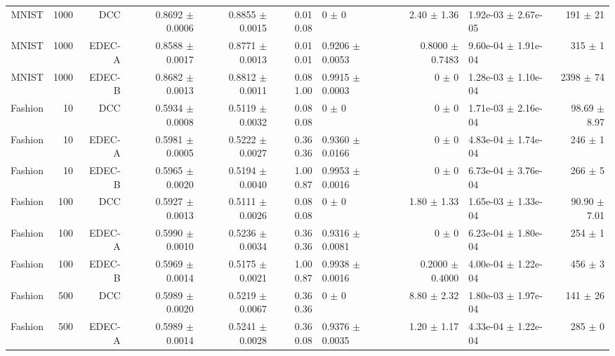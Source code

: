 \begin{table}[ht]
{\begin{tabular}{ | r | r | r | r | r | r | H  r | H  r |}
MNIST & 1000 & DCC & { \color{green} 0.8692 $\pm$ 0.0006} & { \color{green} 0.8855 $\pm$ 0.0015} & { \color{green} 0.01} { \color{green} 0.08} & 0 $\pm$ 0 & 2.40 $\pm$ 1.36 & 1.92e-03 $\pm$ 2.67e-05 & 191 $\pm$ 21 \\ 
MNIST & 1000 & EDEC-A & 0.8588 $\pm$ 0.0017 & 0.8771 $\pm$ 0.0013 & { \color{black}0.01} { \color{black}0.01} & 0.9206 $\pm$ 0.0053 & 0.8000 $\pm$ 0.7483 & 9.60e-04 $\pm$ 1.91e-04 & 315 $\pm$ 1 \\ 
MNIST & 1000 & EDEC-B & { \color{blue} 0.8682 $\pm$ 0.0013} & 0.8812 $\pm$ 0.0011 & { \color{green} 0.08} { \color{black}1.00} & 0.9915 $\pm$ 0.0003 & 0 $\pm$ 0 & 1.28e-03 $\pm$ 1.10e-04 & 2398 $\pm$ 74 \\ \hline 
Fashion & 10 & DCC & 0.5934 $\pm$ 0.0008 & 0.5119 $\pm$ 0.0032 & { \color{black}0.08} { \color{black}0.08} & 0 $\pm$ 0 & 0 $\pm$ 0 & 1.71e-03 $\pm$ 2.16e-04 & 98.69 $\pm$ 8.97 \\ 
Fashion & 10 & EDEC-A & { \color{green} 0.5981 $\pm$ 0.0005} & { \color{green} 0.5222 $\pm$ 0.0027} & { \color{green} 0.36} { \color{green} 0.36} & 0.9360 $\pm$ 0.0166 & 0 $\pm$ 0 & 4.83e-04 $\pm$ 1.74e-04 & 246 $\pm$ 1 \\ 
Fashion & 10 & EDEC-B & { \color{blue} 0.5965 $\pm$ 0.0020} & { \color{blue} 0.5194 $\pm$ 0.0040} & { \color{black}1.00} { \color{green} 0.87} & 0.9953 $\pm$ 0.0016 & 0 $\pm$ 0 & 6.73e-04 $\pm$ 3.76e-04 & 266 $\pm$ 5 \\ \hline 
Fashion & 100 & DCC & 0.5927 $\pm$ 0.0013 & 0.5111 $\pm$ 0.0026 & { \color{black}0.08} { \color{black}0.08} & 0 $\pm$ 0 & 1.80 $\pm$ 1.33 & 1.65e-03 $\pm$ 1.33e-04 & 90.90 $\pm$ 7.01 \\ 
Fashion & 100 & EDEC-A & { \color{green} 0.5990 $\pm$ 0.0010} & { \color{green} 0.5236 $\pm$ 0.0034} & { \color{green} 0.36} { \color{green} 0.36} & 0.9316 $\pm$ 0.0081 & 0 $\pm$ 0 & 6.23e-04 $\pm$ 1.80e-04 & 254 $\pm$ 1 \\ 
Fashion & 100 & EDEC-B & { \color{blue} 0.5969 $\pm$ 0.0014} & { \color{blue} 0.5175 $\pm$ 0.0021} & { \color{green} 1.00} { \color{black}0.87} & 0.9938 $\pm$ 0.0016 & 0.2000 $\pm$ 0.4000 & 4.00e-04 $\pm$ 1.22e-04 & 456 $\pm$ 3 \\ \hline 
Fashion & 500 & DCC & { \color{blue} 0.5989 $\pm$ 0.0020} & { \color{blue} 0.5219 $\pm$ 0.0067} & { \color{green} 0.36} { \color{green} 0.36} & 0 $\pm$ 0 & 8.80 $\pm$ 2.32 & 1.80e-03 $\pm$ 1.97e-04 & 141 $\pm$ 26 \\ 
Fashion & 500 & EDEC-A & { \color{blue} 0.5989 $\pm$ 0.0014} & { \color{green} 0.5241 $\pm$ 0.0028} & { \color{green} 0.36} { \color{green} 0.08} & 0.9376 $\pm$ 0.0035 & 1.20 $\pm$ 1.17 & 4.33e-04 $\pm$ 1.22e-04 & 285 $\pm$ 0 \\ 

\end{tabular}}
\end{table}
